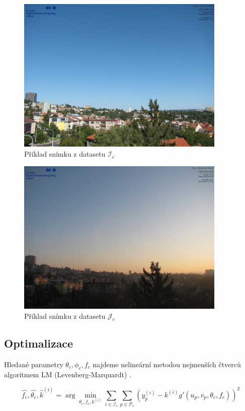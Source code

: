 \begin{figure}[htb]\centering
    \includegraphics[width=100mm]{../img/horizontalgradient}
    \caption{Příklad snímku z datasetu $\mathcal{I}_c$ \citep{chmu}}
\end{figure}

\begin{figure}[htb]\centering
    \includegraphics[width=100mm]{../img/sungradient}
    \caption{Příklad snímku z datasetu $\mathcal{J}_c$ \citep{chmu}}
\end{figure}

\subsection{Optimalizace}

Hledané parametry $\theta_c, \phi_c, f_c$ najdeme nelineární metodou nejmenších čtverců algoritmem LM (Levenberg-Marquardt) \citep{levenberg}.


\begin{equation}
    \hat{f_c}, \hat{\theta_c}, \hat{k}^{(i)} = \arg\min_{\theta_c, f_c, k^{(i)}}  \sum_{i\in\mathcal{I}_c} \sum_{p\in\mathcal{P}_c} \left( y^{(i)}_p - k^{(i)}g'(u_p, v_p, \theta_c, f_c)\right)^2
\end{equation}

